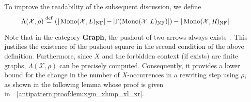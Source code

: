 \begin{definition}
\begin{itemize}
\begin{itemize}
\begin{center}
                \end{center}
            \end{itemize}
    \end{itemize} 
\end{definition}
To improve the readability of the subsequent discussion, we define $$\Lambda(\mathcal{X},\rho) \overset{\operatorname{def}}{=} (|\operatorname{Mono}(\mathcal{X},L)_{\operatorname{NF}}| \mathop{-} 
    |\Gamma(\operatorname{Mono}(\mathcal{X},L)_{\operatorname{NF}})|) -
   |\operatorname{Mono}(\mathcal{X},R)_{\operatorname{NF}}|.$$ 

Note that in the category \textbf{Graph}, the pushout of two arrows always exists~\cite[p.188]{corradini1997algebraic}. This justifies the existence of the pushout square in the second condition of the above definition.
Furthermore, since $X$ and the forbidden context (if exists) are finite graphs, $\Lambda(\mathcal{X},\rho)$ can be precisely computed. Consequently, it provides a lower bound for the change in the number of $X$-occurrences in a rewriting step using $\rho$, as shown in the following lemma whose proof is given in~\textsection~\ref{antipattern:proof:lem:xgm_xhmp_xl_xr}.

